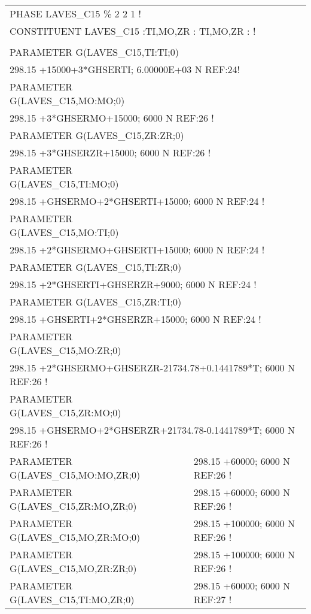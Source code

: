 \begin{longtable}[H]{ l l l }
	\multicolumn{3}{l}{PHASE LAVES\_C15  \%  2 2   1 !}\\
	\multicolumn{3}{l}{CONSTITUENT LAVES\_C15  :TI,MO,ZR : TI,MO,ZR :  !}\\
	& & \\
	PARAMETER G(LAVES\_C15,TI:TI;0) & & \\
	\multicolumn{3}{l}{298.15 +15000+3*GHSERTI; 6.00000E+03   N REF:24!}\\
	PARAMETER G(LAVES\_C15,MO:MO;0) & & \\
	\multicolumn{3}{l}{298.15 +3*GHSERMO+15000; 6000 N REF:26 !}\\
	PARAMETER G(LAVES\_C15,ZR:ZR;0) & & \\
	\multicolumn{3}{l}{298.15 +3*GHSERZR+15000; 6000 N  REF:26 !}\\
	PARAMETER G(LAVES\_C15,TI:MO;0) & & \\ 
	\multicolumn{3}{l}{298.15 +GHSERMO+2*GHSERTI+15000; 6000 N REF:24 !}\\
	PARAMETER G(LAVES\_C15,MO:TI;0) & & \\
	\multicolumn{3}{l}{298.15 +2*GHSERMO+GHSERTI+15000; 6000 N REF:24 !}\\
	PARAMETER G(LAVES\_C15,TI:ZR;0) & & \\
	\multicolumn{3}{l}{298.15 +2*GHSERTI+GHSERZR+9000; 6000 N REF:24 !}\\	 	 
	PARAMETER G(LAVES\_C15,ZR:TI;0) & & \\ 
	\multicolumn{3}{l}{298.15 +GHSERTI+2*GHSERZR+15000; 6000 N REF:24 !}\\
	PARAMETER G(LAVES\_C15,MO:ZR;0) & & \\
	\multicolumn{3}{l}{298.15 +2*GHSERMO+GHSERZR-21734.78+0.1441789*T; 6000 N REF:26 !}\\
	PARAMETER G(LAVES\_C15,ZR:MO;0) & &\\
	\multicolumn{3}{l}{298.15 +GHSERMO+2*GHSERZR+21734.78-0.1441789*T; 6000 N REF:26 !}\\
	PARAMETER G(LAVES\_C15,MO:MO,ZR;0) & \multicolumn{2}{l}{298.15 +60000; 6000 N REF:26 !}\\
	PARAMETER G(LAVES\_C15,ZR:MO,ZR;0) & \multicolumn{2}{l}{298.15 +60000; 6000 N REF:26 !}\\
	PARAMETER G(LAVES\_C15,MO,ZR:MO;0) & \multicolumn{2}{l}{298.15 +100000; 6000 N REF:26 !}\\
	PARAMETER G(LAVES\_C15,MO,ZR:ZR;0) & \multicolumn{2}{l}{298.15 +100000; 6000 N REF:26 !}\\
	PARAMETER G(LAVES\_C15,TI:MO,ZR;0) & \multicolumn{2}{l}{298.15 +60000; 6000 N REF:27 !}\\

\end{longtable}
